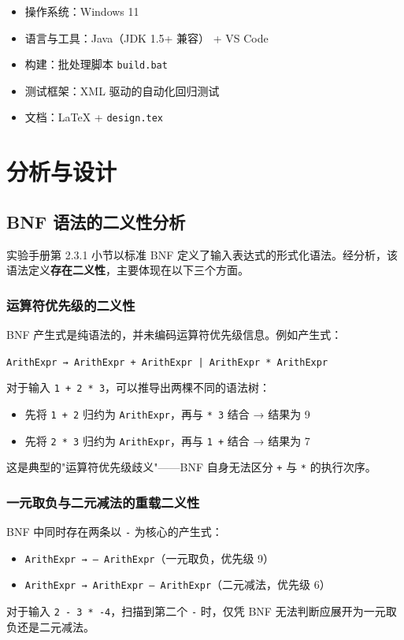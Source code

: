 \documentclass[a4paper]{article}
\begin{document}
\begin{itemize}
    \item 操作系统：Windows 11
    \item 语言与工具：Java（JDK 1.5+ 兼容） + VS Code
    \item 构建：批处理脚本 \texttt{build.bat}
    \item 测试框架：XML 驱动的自动化回归测试
    \item 文档：LaTeX + \texttt{design.tex}
\end{itemize}

\section{分析与设计}

\subsection{BNF 语法的二义性分析}

实验手册第 2.3.1 小节以标准 BNF 定义了输入表达式的形式化语法。经分析，该语法定义\textbf{存在二义性}，主要体现在以下三个方面。

\subsubsection{运算符优先级的二义性}

BNF 产生式是纯语法的，并未编码运算符优先级信息。例如产生式：
\begin{center}
\texttt{ArithExpr → ArithExpr + ArithExpr | ArithExpr * ArithExpr}
\end{center}
对于输入 \texttt{1 + 2 * 3}，可以推导出两棵不同的语法树：
\begin{itemize}
    \item 先将 \texttt{1 + 2} 归约为 \texttt{ArithExpr}，再与 \texttt{* 3} 结合 → 结果为 9
    \item 先将 \texttt{2 * 3} 归约为 \texttt{ArithExpr}，再与 \texttt{1 +} 结合 → 结果为 7
\end{itemize}
这是典型的"运算符优先级歧义"——BNF 自身无法区分 \texttt{+} 与 \texttt{*} 的执行次序。

\subsubsection{一元取负与二元减法的重载二义性}

BNF 中同时存在两条以 \texttt{-} 为核心的产生式：
\begin{itemize}
    \item \texttt{ArithExpr → – ArithExpr}（一元取负，优先级 9）
    \item \texttt{ArithExpr → ArithExpr – ArithExpr}（二元减法，优先级 6）
\end{itemize}
对于输入 \texttt{2 - 3 * -4}，扫描到第二个 \texttt{-} 时，仅凭 BNF 无法判断应展开为一元取负还是二元减法。
\end{document}
